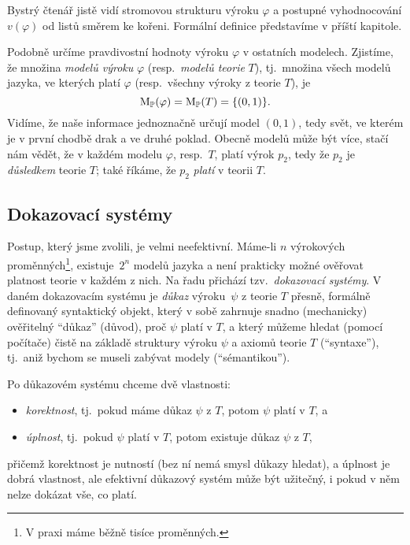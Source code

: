Bystrý čtenář jistě vidí stromovou strukturu výroku \( \varphi \) a postupné vyhodnocování \( v(\varphi) \) od listů směrem ke kořeni. Formální definice představíme v příští kapitole.

Podobně určíme pravdivostní hodnoty výroku \( \varphi \) v ostatních modelech. Zjistíme, že množina \emph{modelů výroku} \( \varphi \) (resp.\ \emph{modelů teorie} \( T \)), tj.\ množina všech modelů jazyka, ve kterých platí \( \varphi \) (resp.\ všechny výroky z teorie \( T \)), je
\[	
    \operatorname{M}_\mathbb P(\varphi)=\operatorname{M}_\mathbb P(T)=\{(0,1)\}.
\]
Vidíme, že naše informace jednoznačně určují model \( (0,1) \), tedy svět, ve kterém je v první chodbě drak a ve druhé poklad. Obecně modelů může být více, stačí nám vědět, že v každém modelu \( \varphi \), resp.{\ }\(T \), platí výrok \( p_2 \), tedy že \( p_2 \) je \emph{důsledkem} teorie \( T \); také říkáme, že \( p_2 \) \emph{platí} v teorii \( T \).

\subsection{Dokazovací systémy}

Postup, který jsme zvolili, je velmi neefektivní. Máme-li \( n \) výrokových proměnných\footnote{V praxi máme běžně tisíce proměnných.}, existuje~\( 2^n \) modelů jazyka a není prakticky možné ověřovat platnost teorie v každém z nich. Na řadu přichází tzv.\ \emph{dokazovací systémy}. V daném dokazovacím systému je \emph{důkaz} výroku~\( \psi \) z teorie \(T\) přesně, formálně definovaný syntaktický objekt, který v sobě zahrnuje snadno (mechanicky) ověřitelný ``důkaz'' (důvod), proč \( \psi \) platí v \(T\), a který můžeme hledat (pomocí počítače) čistě na základě struktury výroku \( \psi \) a axiomů teorie \(T\) (``syntaxe''), tj.\ aniž bychom se museli zabývat modely (``sémantikou'').

Po důkazovém systému chceme dvě vlastnosti: 
\begin{itemize}
    \item \emph{korektnost}, tj.\ pokud máme důkaz \( \psi \) z \(T\), potom \( \psi \) platí v \(T\), a
    \item \emph{úplnost}, tj.\ pokud \( \psi \) platí v \(T\), potom existuje důkaz \( \psi \) z \(T\),
\end{itemize}
přičemž korektnost je nutností (bez ní nemá smysl důkazy hledat), a úplnost je dobrá vlastnost, ale efektivní důkazový systém může být užitečný, i pokud v něm nelze dokázat vše, co platí.

